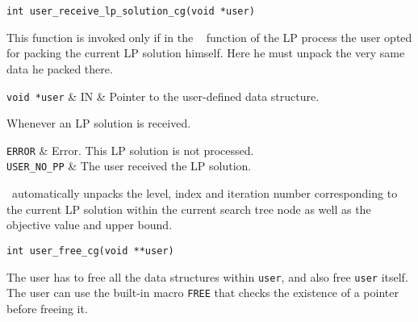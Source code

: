 
\begin{verbatim}
int user_receive_lp_solution_cg(void *user)
\end{verbatim}

\bd

\describe

This function is invoked only if in the {\tt
{}} function
of the LP process the user opted for packing the current LP solution
himself. Here he must unpack the very same data he packed there.

\args

{\tt void *user} & IN & Pointer to the user-defined data structure. \\
\et

\item[Invoked from:] Whenever an LP solution is received.

\returns

{\tt ERROR} & Error. This LP solution is not processed. \\
{\tt USER\_NO\_PP} & The user received the LP solution. \\
\et

\item[Note:] \hfill

\BB\ automatically unpacks the level, index and iteration number
corresponding to the current LP solution within the current search tree node
as well as the objective value and upper bound.

\ed

\vspace{1ex}


\begin{verbatim}
int user_free_cg(void **user)
\end{verbatim}

\bd

\describe

The user has to free all the data structures within {\tt user}, and also free
{\tt user} itself. The user can use the built-in macro {\tt FREE} that checks
the existence of a pointer before freeing it. 

